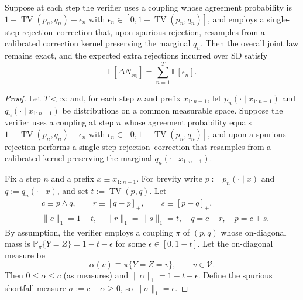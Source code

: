 \begin{proposition}\label{prop:tv-rejection-sum}
Suppose at each step the verifier uses a coupling whose agreement probability is $1-\operatorname{TV}(p_n,q_n)-\epsilon_n$ with $\epsilon_n\in[0,1-\operatorname{TV}(p_n,q_n)]$, and employs a single-step rejection--correction that, upon spurious rejection, resamples from a calibrated correction kernel preserving the marginal $q_n$. Then the overall joint law remains exact, and the expected extra rejections incurred over SD satisfy
\[
\mathbb E[\Delta N_{\mathrm{rej}}]=\sum_{n=1}^T\mathbb E[\epsilon_n].
\]
\end{proposition}

\begin{proof}
Let $T<\infty$ and, for each step $n$ and prefix $x_{1:n-1}$, let $p_n(\cdot\mid x_{1:n-1})$ and $q_n(\cdot\mid x_{1:n-1})$ be distributions on a common measurable space. Suppose the verifier uses a coupling at step $n$ whose agreement probability equals $1-\operatorname{TV}(p_n,q_n)-\epsilon_n$ with $\epsilon_n\in[0,1-\operatorname{TV}(p_n,q_n)]$, and upon a spurious rejection performs a single-step rejection--correction that resamples from a calibrated kernel preserving the marginal $q_n(\cdot\mid x_{1:n-1})$.

Fix a step $n$ and a prefix $x\equiv x_{1:n-1}$. For brevity write $p:=p_n(\cdot\mid x)$ and $q:=q_n(\cdot\mid x)$, and set $t:=\operatorname{TV}(p,q)$. Let
\[
\begin{aligned}
&c \equiv p\wedge q,\qquad r \equiv [q-p]_+,\qquad s \equiv [p-q]_+,\\
&\|c\|_1=1-t,\quad \|r\|_1=\|s\|_1=t,\quad q=c+r,\quad p=c+s.
\end{aligned}
\]
By assumption, the verifier employs a coupling $\pi$ of $(p,q)$ whose on-diagonal mass is $\mathbb P_{\pi}\{Y=Z\}=1-t-\epsilon$ for some $\epsilon\in[0,1-t]$. Let the on-diagonal measure be
\[
\alpha(v)\equiv \pi\{Y=Z=v\},\qquad v\in\mathcal V.
\]
Then $0\le \alpha\le c$ (as measures) and $\|\alpha\|_1=1-t-\epsilon$. Define the spurious shortfall measure $\sigma:=c-\alpha\ge 0$, so $\|\sigma\|_1=\epsilon$.


\end{proof}
